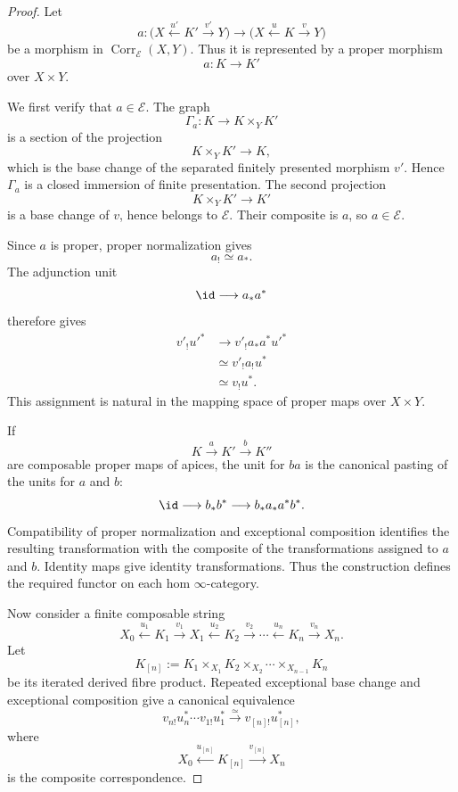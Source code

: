 \begin{proof}
Let
\[
    a:
    \bigl(
      X\xleftarrow{u'}K'\xrightarrow{v'}Y
    \bigr)
    \longrightarrow
    \bigl(
      X\xleftarrow{u}K\xrightarrow{v}Y
    \bigr)
\]
be a morphism in
\(\operatorname{Corr}_{\mathcal E}(X,Y)\).
Thus it is represented by a proper morphism
\[
    a:K\longrightarrow K'
\]
over \(X\times Y\).

We first verify that \(a\in\mathcal E\).  The graph
\[
    \Gamma_a:
    K\longrightarrow K\times_YK'
\]
is a section of the projection
\[
    K\times_YK'\longrightarrow K,
\]
which is the base change of the separated finitely presented morphism
\(v'\).  Hence \(\Gamma_a\) is a closed immersion of finite presentation.
The second projection
\[
    K\times_YK'\longrightarrow K'
\]
is a base change of \(v\), hence belongs to \(\mathcal E\).  Their composite
is \(a\), so \(a\in\mathcal E\).

Since \(a\) is proper, proper normalization gives
\[
    a_!\simeq a_*.
\]
The adjunction unit
\[
    \id\longrightarrow a_*a^*
\]
therefore gives
\[
\begin{aligned}
    v'_!u'^*
    &\longrightarrow
    v'_!a_*a^*u'^* \\
    &\simeq
    v'_!a_!u^* \\
    &\simeq
    v_!u^*.
\end{aligned}
\]
This assignment is natural in the mapping space of proper maps over
\(X\times Y\).

If
\[
    K\xrightarrow{a}K'\xrightarrow{b}K''
\]
are composable proper maps of apices, the unit for \(ba\) is the canonical
pasting of the units for \(a\) and \(b\):
\[
    \id
    \longrightarrow
    b_*b^*
    \longrightarrow
    b_*a_*a^*b^*.
\]
Compatibility of proper normalization and exceptional composition
identifies the resulting transformation with the composite of the
transformations assigned to \(a\) and \(b\).  Identity maps give identity
transformations.  Thus the construction defines the required functor on
each hom \(\infty\)-category.

Now consider a finite composable string
\[
    X_0
    \xleftarrow{u_1}
    K_1
    \xrightarrow{v_1}
    X_1
    \xleftarrow{u_2}
    K_2
    \xrightarrow{v_2}
    \cdots
    \xleftarrow{u_n}
    K_n
    \xrightarrow{v_n}
    X_n.
\]
Let
\[
    K_{[n]}
    :=
    K_1
    \times_{X_1}
    K_2
    \times_{X_2}\cdots
    \times_{X_{n-1}}
    K_n
\]
be its iterated derived fibre product.  Repeated exceptional base change
and exceptional composition give a canonical equivalence
\[
    v_{n!}u_n^*\cdots v_{1!}u_1^*
    \xrightarrow{\simeq}
    v_{[n]!}u_{[n]}^*,
\]
where
\[
    X_0
    \xleftarrow{u_{[n]}}
    K_{[n]}
    \xrightarrow{v_{[n]}}
    X_n
\]
is the composite correspondence.


\end{proof}
